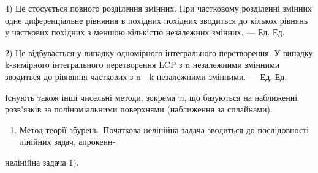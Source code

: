 \documentclass[
  ukrainian,
]{article}
\providecommand{\tightlist}{%
  \setlength{\itemsep}{0pt}\setlength{\parskip}{0pt}}
\begin{document}
4) Це стосується повного розділення змінних. При частковому розділенні
змінних одне диференціальне рівняння в похідних похідних зводиться до
кількох рівнянь у часткових похідних з меншою кількістю незалежних
змінних. --- Ед. Ед.

2) Це відбувається у випадку одномірного інтегрального перетворення. У
випадку k-вимірного інтегрального перетворення LCP з n незалежними
змінними зводиться до рівняння часткових з n---k незалежними змінними.
--- Ед. Ед.

Існують також інші чисельні методи, зокрема ті, що базуються на
наближенні розв'язків за поліноміальними поверхнями (наближення за
сплайнами).

\begin{enumerate}
\def\labelenumi{\arabic{enumi}.}
\setcounter{enumi}{5}
\tightlist
\item
  Метод теорії збурень. Початкова нелінійна задача зводиться до
  послідовності лінійних задач, апрокенн-
\end{enumerate}

нелінійна задача 1).
\end{document}
